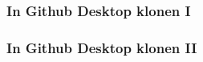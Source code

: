 \documentclass[12pt,ngerman]{beamer}
\begin{document}
\begin{frame}
\frametitle{In Github Desktop klonen I}

\begin{center}
\end{center}

\end{frame}

\begin{frame}
\frametitle{In Github Desktop klonen II}

\begin{center}
\end{center}

\end{frame}
\end{document}
